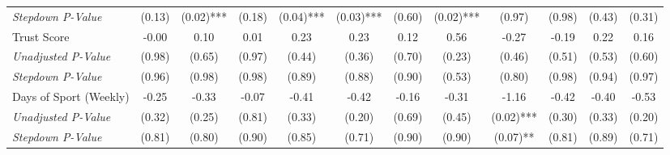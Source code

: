 \begin{tabular}{l c c c c c c c c c c c}
\quad \textit{Stepdown P-Value} & (0.13) & (0.02)*** & (0.18) & (0.04)*** & (0.03)*** & (0.60) & (0.02)*** & (0.97) & (0.98) & (0.43) & (0.31) \\
Trust Score & -0.00 & 0.10 & 0.01 & 0.23 & 0.23 & 0.12 & 0.56 & -0.27 & -0.19 & 0.22 & 0.16 \\
\quad \textit{Unadjusted P-Value} & (0.98) & (0.65) & (0.97) & (0.44) & (0.36) & (0.70) & (0.23) & (0.46) & (0.51) & (0.53) & (0.60) \\
\quad \textit{Stepdown P-Value} & (0.96) & (0.98) & (0.98) & (0.89) & (0.88) & (0.90) & (0.53) & (0.80) & (0.98) & (0.94) & (0.97) \\
Days of Sport (Weekly) & -0.25 & -0.33 & -0.07 & -0.41 & -0.42 & -0.16 & -0.31 & -1.16 & -0.42 & -0.40 & -0.53 \\
\quad \textit{Unadjusted P-Value} & (0.32) & (0.25) & (0.81) & (0.33) & (0.20) & (0.69) & (0.45) & (0.02)*** & (0.30) & (0.33) & (0.20) \\
\quad \textit{Stepdown P-Value} & (0.81) & (0.80) & (0.90) & (0.85) & (0.71) & (0.90) & (0.90) & (0.07)** & (0.81) & (0.89) & (0.71) \\
\bottomrule
\end{tabular}
